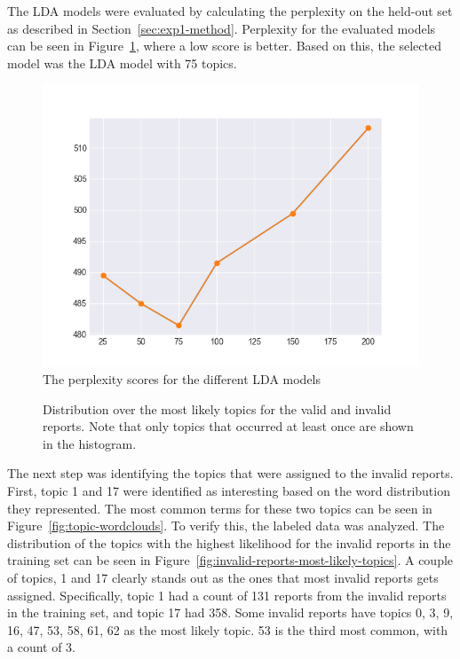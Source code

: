 The LDA models were evaluated by calculating the perplexity on the held-out set as described in Section~\ref{sec:exp1-method}.
Perplexity for the evaluated models can be seen in Figure~\ref{fig:lda-perplexity}, where a low score is better.
Based on this, the selected model was the LDA model with 75 topics.

\begin{figure}[h!]
    \centering
    \includegraphics[width=\textwidth]{figures/lda-perplexity.png}
    \caption{The perplexity scores for the different LDA models}
    \label{fig:lda-perplexity}
\end{figure}

\begin{figure}[h!]
    \centering
    \caption{Distribution over the most likely topics for the valid and invalid reports. Note that only topics that occurred at least once are shown in the histogram.}
    \label{fig:most-likely-topics}
\end{figure}

The next step was identifying the topics that were assigned to the invalid reports.
First, topic 1 and 17 were identified as interesting based on the word distribution they represented.
The most common terms for these two topics can be seen in Figure~\ref{fig:topic-wordclouds}.
To verify this, the labeled data was analyzed.
The distribution of the topics with the highest likelihood for the invalid reports in the training set can be seen in Figure~\ref{fig:invalid-reports-most-likely-topics}.
A couple of topics, 1 and 17 clearly stands out as the ones that most invalid reports gets assigned.
Specifically, topic 1 had a count of 131 reports from the invalid reports in the training set, and topic 17 had 358.
Some invalid reports have topics 0, 3, 9, 16, 47, 53, 58, 61, 62 as the most likely topic.
53 is the third most common, with a count of 3.

